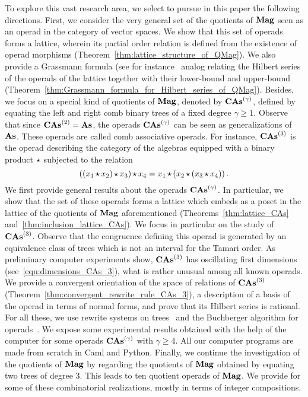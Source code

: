 To explore this vast research area, we select to pursue in this paper
the following directions. First, we consider the very general set of the
quotients of $\mathbf{Mag}$ seen as an operad in the category of vector spaces.
We show that this set of operads forms a lattice, wherein its partial
order relation is defined from the existence of operad morphisms
(Theorem~\ref{thm:lattice_structure_of_QMag}). We also provide a
Grassmann formula (see for instance~\cite{Lan02} analog relating the
Hilbert series of the operads of the lattice together with their
lower-bound and upper-bound
(Theorem~\ref{thm:Grassmann_formula_for_Hilbert_series_of_QMag}).
Besides, we focus on a special kind of quotients of $\mathbf{Mag}$, denoted by
$\mathbf{CAs}^{\left(\gamma\right)}$, defined by equating the left and right comb binary trees
of a fixed degree $\gamma \geq 1$. Observe that since $\mathbf{CAs}^{\left(2\right)}=\mathbf{As}$, the
operads $\mathbf{CAs}^{\left(\gamma\right)}$ can be seen as generalizations of $\mathbf{As}$. These
operads are called comb associative operads. For instance, $\mathbf{CAs}^{\left(3\right)}$ is
the operad describing the category of the algebras equipped with a
binary product $\operatorname{\star}$ subjected to the relation
\begin{equation}
    \left(\left(x_1 \operatorname{\star} x_2\right) \operatorname{\star} x_3\right) \operatorname{\star} x_4
    =
    x_1 \operatorname{\star} \left(x_2 \operatorname{\star} \left(x_3 \operatorname{\star} x_4\right)\right).
\end{equation}
We first provide general results about the operads $\mathbf{CAs}^{\left(\gamma\right)}$. In
particular, we show that the set of these operads forms a lattice which
embeds as a poset in the lattice of the quotients of $\mathbf{Mag}$
aforementioned (Theorems~\ref{thm:lattice_CAs}
and~\ref{thm:inclusion_lattice_CAs}). We focus in particular on the
study of $\mathbf{CAs}^{\left(3\right)}$. Observe that the congruence defining this operad is
generated by an equivalence class of trees which is not an interval for
the Tamari order. As preliminary computer experiments show, $\mathbf{CAs}^{\left(3\right)}$
has oscillating first dimensions (see~\eqref{equ:dimensions_CAs_3}),
what is rather unusual among all known operads. We provide a convergent
orientation of the space of relations of $\mathbf{CAs}^{\left(3\right)}$
(Theorem~\ref{thm:convergent_rewrite_rule_CAs_3}), a description of a
basis of the operad in terms of normal forms, and prove that its Hilbert
series is rational. For all these, we use rewrite systems on
trees~\cite{BN98} and the Buchberger algorithm for operads~\cite{DK10}.
We expose some experimental results obtained with the help of the
computer for some operads $\mathbf{CAs}^{\left(\gamma\right)}$ with $\gamma \geq 4$.
All our computer programs are made from scratch in {\sc Caml} and
{\sc Python}. Finally, we continue the investigation of the quotients
of $\mathbf{Mag}$ by regarding the quotients of $\mathbf{Mag}$ obtained by equating two
trees of degree $3$. This leads to ten quotient operads of $\mathbf{Mag}$. We
provide for some of these combinatorial realizations, mostly in terms
of integer compositions.
\medbreak

